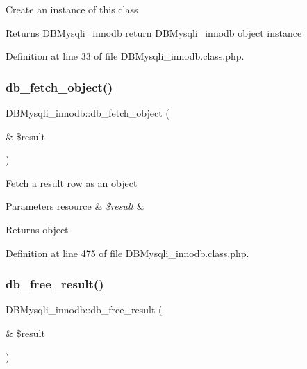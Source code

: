 Create an instance of this class \begin{DoxyReturn}{Returns}
\hyperlink{classDBMysqli__innodb}{D\+B\+Mysqli\+\_\+innodb} return \hyperlink{classDBMysqli__innodb}{D\+B\+Mysqli\+\_\+innodb} object instance 
\end{DoxyReturn}


Definition at line 33 of file D\+B\+Mysqli\+\_\+innodb.\+class.\+php.

\mbox{\label{classDBMysqli__innodb_a676cdff9d50d9398c0c2e3f9d50e8c0a}} 
\subsubsection{\texorpdfstring{db\+\_\+fetch\+\_\+object()}{db\_fetch\_object()}}
{\footnotesize\ttfamily D\+B\+Mysqli\+\_\+innodb\+::db\+\_\+fetch\+\_\+object (\begin{DoxyParamCaption}\item[{\&}]{\$result }\end{DoxyParamCaption})}

Fetch a result row as an object 
\begin{DoxyParams}[1]{Parameters}
resource & {\em \$result} & \\
\hline
\end{DoxyParams}
\begin{DoxyReturn}{Returns}
object 
\end{DoxyReturn}


Definition at line 475 of file D\+B\+Mysqli\+\_\+innodb.\+class.\+php.

\mbox{\label{classDBMysqli__innodb_a0eb1700db91867677a8f7fa9e2f25298}} 
\subsubsection{\texorpdfstring{db\+\_\+free\+\_\+result()}{db\_free\_result()}}
{\footnotesize\ttfamily D\+B\+Mysqli\+\_\+innodb\+::db\+\_\+free\+\_\+result (\begin{DoxyParamCaption}\item[{\&}]{\$result }\end{DoxyParamCaption})}

